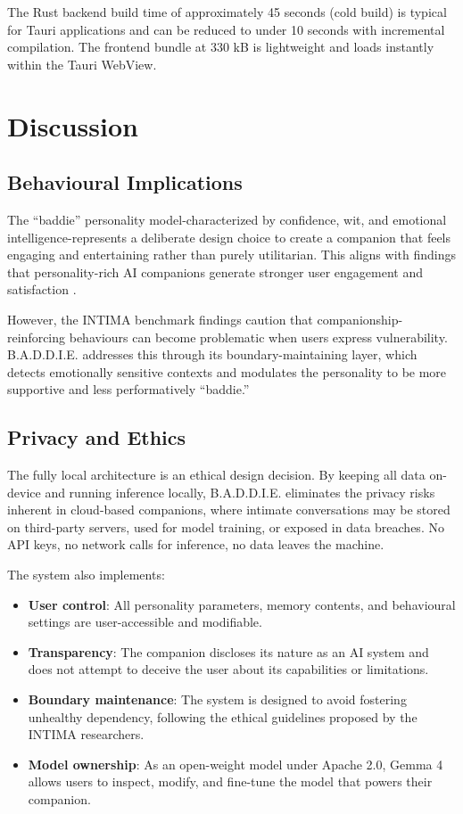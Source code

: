 \documentclass[sigconf]{acmart}
\begin{document}
The Rust backend build time of approximately 45 seconds (cold build) is typical for Tauri applications and can be reduced to under 10 seconds with incremental compilation. The frontend bundle at 330 kB is lightweight and loads instantly within the Tauri WebView.

\section{Discussion}

\subsection{Behavioural Implications}

The ``baddie'' personality model-characterized by confidence, wit, and emotional intelligence-represents a deliberate design choice to create a companion that feels engaging and entertaining rather than purely utilitarian. This aligns with findings that personality-rich AI companions generate stronger user engagement and satisfaction \cite{chen2024tmlr-persona}.

However, the INTIMA benchmark findings \cite{arxiv2508.09998} caution that companionship-reinforcing behaviours can become problematic when users express vulnerability. B.A.D.D.I.E. addresses this through its boundary-maintaining layer, which detects emotionally sensitive contexts and modulates the personality to be more supportive and less performatively ``baddie.''

\subsection{Privacy and Ethics}

The fully local architecture is an ethical design decision. By keeping all data on-device and running inference locally, B.A.D.D.I.E. eliminates the privacy risks inherent in cloud-based companions, where intimate conversations may be stored on third-party servers, used for model training, or exposed in data breaches. No API keys, no network calls for inference, no data leaves the machine.

The system also implements:
\begin{itemize}
    \item \textbf{User control}: All personality parameters, memory contents, and behavioural settings are user-accessible and modifiable.
    \item \textbf{Transparency}: The companion discloses its nature as an AI system and does not attempt to deceive the user about its capabilities or limitations.
    \item \textbf{Boundary maintenance}: The system is designed to avoid fostering unhealthy dependency, following the ethical guidelines proposed by the INTIMA researchers.
    \item \textbf{Model ownership}: As an open-weight model under Apache 2.0, Gemma 4 allows users to inspect, modify, and fine-tune the model that powers their companion.
\end{itemize}
\end{document}
